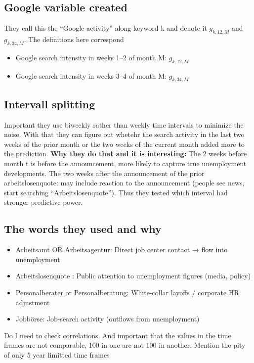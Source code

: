 \documentclass{article}
\begin{document}
\subsection{Google variable created}
They call this the “Google activity” along keyword k and denote it $g_{k,12,M}$ and $g_{k,34,M}$.
The definitions here correspond
\begin{itemize}
    \item Google search intensity in weeks 1–2 of month M: $g_{k,12,M}$
    \item  Google search intensity in weeks 3–4 of month M: 
    $g_{k,34,M}$
\end{itemize}

\subsection{Intervall splitting}
Important they use  biweekly rather than weekly
time intervals to minimize the noise.
With that they can figure out whetehr the search activity in the last two weeks of the prior month or the  two weeks of the current month added more to the prediction. 
\textbf{Why they do that and it is interesting:}
The 2 weeks before month t is before the announcement, more likely to capture true unemployment developments. The two weeks after the announcement of the prior arbeitslosenquote:  may include reaction to the announcement (people see news, start searching “Arbeitslosenquote”).
Thus they tested which interval had stronger predictive power.

\subsection{The words they used and why}
\begin{itemize}
    \item Arbeitsamt OR Arbeitsagentur: Direct job center contact → flow into unemployment
    \item Arbeitslosenquote : Public attention to unemployment figures (media, policy)
    \item Personalberater or Personalberatung: White-collar layoffs / corporate HR adjustment
    \item Jobbörse: Job-search activity (outflows from unemployment)
\end{itemize}
Do I need to check correlations. And important that the values in the time frames are not comparable, 100 in one are not 100 in another.
Mention the pity of only 5 year limitted time frames
\end{document}
